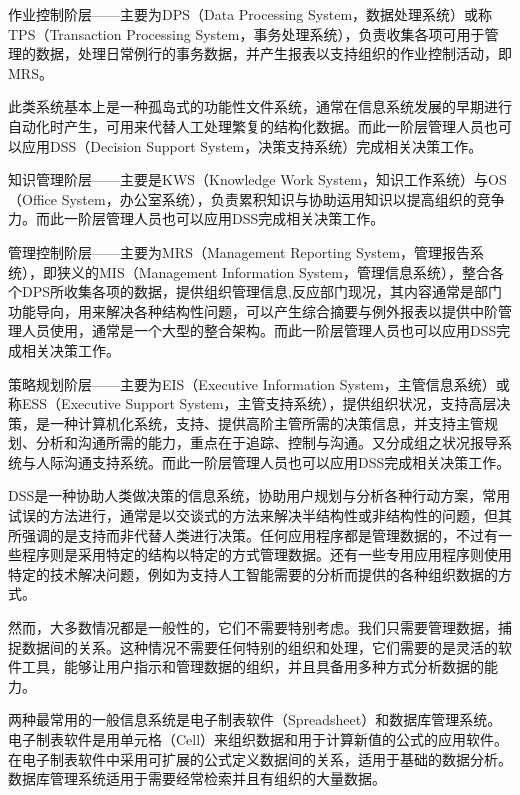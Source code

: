\begin{compactitem}
\item 作业控制阶层——主要为DPS（Data Processing System，数据处理系统）或称TPS（Transaction Processing System，事务处理系统），负责收集各项可用于管理的数据，处理日常例行的事务数据，并产生报表以支持组织的作业控制活动，即MRS。

此类系统基本上是一种孤岛式的功能性文件系统，通常在信息系统发展的早期进行自动化时产生，可用来代替人工处理繁复的结构化数据。而此一阶层管理人员也可以应用DSS（Decision Support System，决策支持系统）完成相关决策工作。

\item 知识管理阶层——主要是KWS（Knowledge Work System，知识工作系统）与OS（Office System，办公室系统），负责累积知识与协助运用知识以提高组织的竞争力。而此一阶层管理人员也可以应用DSS完成相关决策工作。

\item 管理控制阶层——主要为MRS（Management Reporting System，管理报告系统），即狭义的MIS（Management Information System，管理信息系统），整合各个DPS所收集各项的数据，提供组织管理信息,反应部门现况，其内容通常是部门功能导向，用来解决各种结构性问题，可以产生综合摘要与例外报表以提供中阶管理人员使用，通常是一个大型的整合架构。而此一阶层管理人员也可以应用DSS完成相关决策工作。

\item 策略规划阶层——主要为EIS（Executive Information System，主管信息系统）或称ESS（Executive Support System，主管支持系统），提供组织状况，支持高层决策，是一种计算机化系统，支持、提供高阶主管所需的决策信息，并支持主管规划、分析和沟通所需的能力，重点在于追踪、控制与沟通。又分成组之状况报导系统与人际沟通支持系统。而此一阶层管理人员也可以应用DSS完成相关决策工作。


\end{compactitem}

DSS是一种协助人类做决策的信息系统，协助用户规划与分析各种行动方案，常用试误的方法进行，通常是以交谈式的方法来解决半结构性或非结构性的问题，但其所强调的是支持而非代替人类进行决策。任何应用程序都是管理数据的，不过有一些程序则是采用特定的结构以特定的方式管理数据。还有一些专用应用程序则使用特定的技术解决问题，例如为支持人工智能需要的分析而提供的各种组织数据的方式。

然而，大多数情况都是一般性的，它们不需要特别考虑。我们只需要管理数据，捕捉数据间的关系。这种情况不需要任何特别的组织和处理，它们需要的是灵活的软件工具，能够让用户指示和管理数据的组织，并且具备用多种方式分析数据的能力。

两种最常用的一般信息系统是电子制表软件（Spreadsheet）和数据库管理系统。电子制表软件是用单元格（Cell）来组织数据和用于计算新值的公式的应用软件。在电子制表软件中采用可扩展的公式定义数据间的关系，适用于基础的数据分析。数据库管理系统适用于需要经常检索并且有组织的大量数据。

